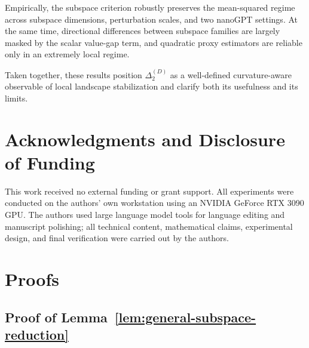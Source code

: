 \documentclass[10pt]{article}
\theoremstyle{plain}
\theoremstyle{remark}
\begin{document}
Empirically, the subspace criterion robustly preserves the mean-squared regime across subspace dimensions, perturbation scales, and two nanoGPT settings.
At the same time, directional differences between subspace families are largely masked by the scalar value-gap term, and quadratic proxy estimators are reliable only in an extremely local regime.

Taken together, these results position $\Delta_2^{(D)}$ as a well-defined curvature-aware observable of local landscape stabilization and clarify both its usefulness and its limits.

\section*{Acknowledgments and Disclosure of Funding}
This work received no external funding or grant support.
All experiments were conducted on the authors' own workstation using an NVIDIA GeForce RTX 3090 GPU.
The authors used large language model tools for language editing and manuscript polishing; all technical content, mathematical claims, experimental design, and final verification were carried out by the authors.




\appendix

\section{Proofs}
\label{app:proofs}

\allowdisplaybreaks

\subsection{Proof of Lemma~\ref{lem:general-subspace-reduction}}
\end{document}
